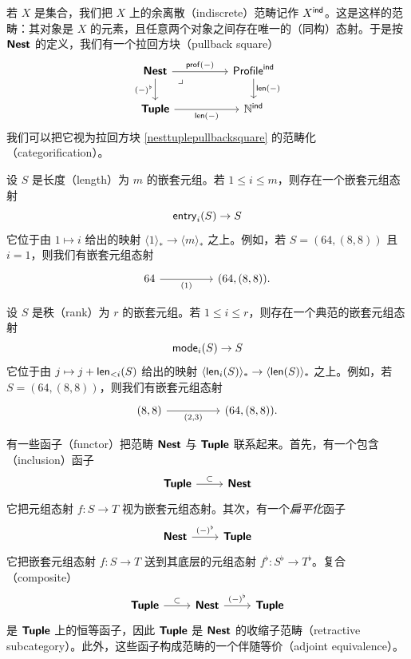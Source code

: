 \begin{observation}
    若 $X$ 是集合，我们把 $X$ 上的余离散（indiscrete）范畴记作 $X^{\mathsf{ind}}$。这是这样的范畴：其对象是 $X$ 的元素，且任意两个对象之间存在唯一的（同构）态射。于是按 ${\boldsymbol{\mathsf{Nest}}}$ 的定义，我们有一个拉回方块（pullback square）
    \[\begin{tikzcd}
        \catstyle{Nest} \ar[rr,"\profile(-)"] \ar[d,swap,"(-)^\flat"] \arrow[drr, phantom, "\lrcorner", very near start]& &  \mathterm{Profile}^{\mathterm{ind}}\ar[d,"\len(-)"] \\
        \catstyle{Tuple} \ar[rr,swap,"\len(-)"] & & \mathbb{N}^{\mathterm{ind}}
    \end{tikzcd}\]
    我们可以把它视为拉回方块 \ref{nesttuplepullbacksquare} 的范畴化（categorification）。
\end{observation}



\begin{example}
    设 $S$ 是长度（length）为 $m$ 的嵌套元组。若 $ 1 \leq i \leq m$，则存在一个嵌套元组态射
    \[
    \mathsf{entry}_i(S) \to S
    \]
    它位于由 $1 \mapsto i$ 给出的映射 $\langle 1 \rangle_* \to \langle m \rangle_*$ 之上。例如，若 $S = (64,(8,8))$ 且 $i = 1$，则我们有嵌套元组态射
    \[ \begin{tikzcd}
    64 \ar[rr,swap,"(1)"] & &  (64,(8,8)).
    \end{tikzcd} \]
\end{example}

\begin{example}
    设 $S$ 是秩（rank）为 $r$ 的嵌套元组。若 $1 \leq i \leq r$，则存在一个典范的嵌套元组态射
    \[
    \mathsf{mode}_i(S) \to S
    \]
    它位于由 $j \mapsto j + \mathsf{len}_{<i}(S)$ 给出的映射 $\langle \mathsf{len}_i(S) \rangle_* \to \langle \mathsf{len}(S) \rangle_*$ 之上。例如，若 $S = (64,(8,8))$，则我们有嵌套元组态射
    \[ \begin{tikzcd}
    (8,8) \ar[rr,swap,"(2{,}3)"] & & (64,(8,8)).
    \end{tikzcd} \]
\end{example}

\begin{observation} 有一些函子（functor）把范畴 ${\boldsymbol{\mathsf{Nest}}}$ 与 ${\boldsymbol{\mathsf{Tuple}}}$ 联系起来。首先，有一个包含（inclusion）函子
    \[ \begin{tikzcd}
    \catstyle{Tuple} \ar[r,"\subset"] &  \catstyle{Nest}
    \end{tikzcd} \]
    它把元组态射 $f:S \to T$ 视为嵌套元组态射。其次，有一个{\it 扁平化}函子
    \[ \begin{tikzcd}
    \catstyle{Nest} \ar[r,"(-)^\flat"] & \catstyle{Tuple}
    \end{tikzcd} \]
    它把嵌套元组态射 $f:S \to T$ 送到其底层的元组态射 $f^\flat:S^\flat \to T^\flat$。复合（composite）
    \[ \begin{tikzcd}
    \catstyle{Tuple} \ar[r,"\subset"] & \catstyle{Nest} \ar[r,"(-)^\flat"] & \catstyle{Tuple}
    \end{tikzcd} \]
    是 ${\boldsymbol{\mathsf{Tuple}}}$ 上的恒等函子，因此 ${\boldsymbol{\mathsf{Tuple}}}$ 是 ${\boldsymbol{\mathsf{Nest}}}$ 的收缩子范畴（retractive subcategory）。此外，这些函子构成范畴的一个伴随等价（adjoint equivalence）。
\end{observation}

